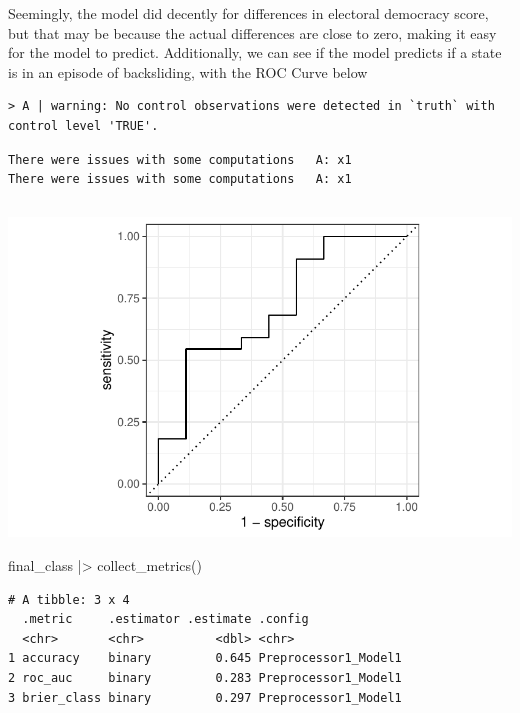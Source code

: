 \documentclass[
  letterpaper,
  DIV=11,
  numbers=noendperiod]{scrartcl}
\newenvironment{Shaded}{\begin{snugshade}}{\end{snugshade}}
\newcommand{\FunctionTok}[1]{\textcolor[rgb]{0.28,0.35,0.67}{#1}}
\newcommand{\NormalTok}[1]{\textcolor[rgb]{0.00,0.23,0.31}{#1}}
\newcommand{\SpecialCharTok}[1]{\textcolor[rgb]{0.37,0.37,0.37}{#1}}
\begin{document}
Seemingly, the model did decently for differences in electoral democracy
score, but that may be because the actual differences are close to zero,
making it easy for the model to predict. Additionally, we can see if the
model predicts if a state is in an episode of backsliding, with the ROC
Curve below

\begin{verbatim}
> A | warning: No control observations were detected in `truth` with control level 'TRUE'.
\end{verbatim}

\begin{verbatim}
There were issues with some computations   A: x1
There were issues with some computations   A: x1
\end{verbatim}

\begin{verbatim}
\end{verbatim}

\includegraphics{Episode_2_files/figure-pdf/backslided-1.pdf}

\begin{Shaded}
\begin{Highlighting}[]
\NormalTok{final\_class }\SpecialCharTok{|\textgreater{}} \FunctionTok{collect\_metrics}\NormalTok{()}
\end{Highlighting}
\end{Shaded}

\begin{verbatim}
# A tibble: 3 x 4
  .metric     .estimator .estimate .config             
  <chr>       <chr>          <dbl> <chr>               
1 accuracy    binary         0.645 Preprocessor1_Model1
2 roc_auc     binary         0.283 Preprocessor1_Model1
3 brier_class binary         0.297 Preprocessor1_Model1
\end{verbatim}
\end{document}
